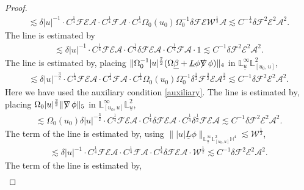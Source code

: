 \documentclass[11pt,reqno]{amsart}
\theoremstyle{definition}
\numberwithin{equation}{section}
\renewcommand{\L}{\mathbb{L}}
\renewcommand{\H}{\mathbb{H}}
\def\betab{\underline{\beta}}
\def\Lb{\underline{L}}
\def\ub{\underline{u}}
\def\nablas{\mbox{$\nabla \mkern -13mu /$ }}
\begin{document}
\begin{proof}
\begin{align*}
\lesssim\delta|u|^{-1}\cdot C^{\frac{1}{4}}\mathscr{F}\mathscr{E}\mathcal{A}\cdot  C^{\frac{1}{4}}\mathscr{F}\mathcal{A}\cdot C^{\frac{1}{4}}\Omega_0(u_0)\Omega_0^{-1}\delta\mathscr{F}\mathscr{E}\mathscr{W}^{\frac{1}{2}}\mathcal{A}\lesssim C^{-\frac{1}{4}}\delta\mathscr{F}^2\mathscr{E}^2\mathcal{A}^2.
\end{align*}
The  line is estimated by
\begin{align*}
\lesssim\delta|u|^{-1}\cdot C^{\frac{1}{4}}\mathscr{F}\mathscr{E}\mathcal{A}\cdot C^{\frac{1}{4}}\delta\mathscr{F}\mathscr{E}\mathcal{A}\cdot C^{\frac{1}{4}}\mathscr{F}\mathcal{A}\cdot1\lesssim C^{-1}\delta\mathscr{F}^2\mathscr{E}^2\mathcal{A}^2.
\end{align*}
The  line is estimated by, placing $\|\Omega_0^{-1}|u|^{\frac{7}{2}}(\Omega\betab+\Lb\phi\nablas\phi)\|_4$ in $\L_{\ub}^\infty\L^2_{[u_0,u]}$,
\begin{align*}
\lesssim\delta|u|^{-\frac{3}{2}}\cdot C^{\frac{1}{4}}\mathscr{F}\mathscr{E}\mathcal{A}\cdot  C^{\frac{1}{4}}\mathscr{F}\mathcal{A}\cdot C^{\frac{1}{4}}\Omega_0(u_0)\Omega_0^{-1}\delta^{\frac{3}{2}}\mathscr{F}^\frac{3}{2}\mathscr{E}\mathcal{A}^{\frac{3}{2}}\lesssim C^{-1}\delta\mathscr{F}^2\mathscr{E}^2\mathcal{A}^2.
\end{align*}
Here we have used the auxiliary condition \eqref{auxiliary}. The  line is estimated by, placing $\Omega_0|u|^{\frac{3}{2}}\|\nablas\phi\|_5$ in $\L^\infty_{[u_0,u]}\L_{\ub}^2$,
\begin{align*}
\lesssim\Omega_0(u_0)\delta|u|^{-\frac{3}{2}}\cdot C^{\frac{1}{4}}\mathscr{F}\mathscr{E}\mathcal{A}\cdot  C^{\frac{1}{4}}\delta\mathscr{F}\mathscr{E}\mathcal{A}\cdot C^{\frac{1}{4}}\delta^{\frac{1}{2}}\mathscr{F}\mathscr{E}\mathcal{A}\lesssim C^{-1}\delta\mathscr{F}^2\mathscr{E}^2\mathcal{A}^2.
\end{align*}
The  term of the  line is estimated by, using $\||u|\Lb\phi\|_{\L^\infty_{\ub}\L^2_{[u_0,u]}\H^4}\lesssim\mathscr{W}^{\frac{1}{2}}$,
\begin{align*}
\lesssim\delta|u|^{-1}\cdot C^{\frac{1}{4}}\mathscr{F}\mathscr{E}\mathcal{A}\cdot  C^{\frac{1}{4}}\mathscr{F}\mathcal{A}\cdot C^{\frac{1}{4}}\delta\mathscr{F}\mathscr{E}\mathcal{A}\cdot\mathscr{W}^{\frac{1}{2}}\lesssim C^{-1}\delta\mathscr{F}^2\mathscr{E}^2\mathcal{A}^2.
\end{align*}
The  term of the  line is estimated by,
\begin{align*}

\end{align*}
\end{proof}
\end{document}
